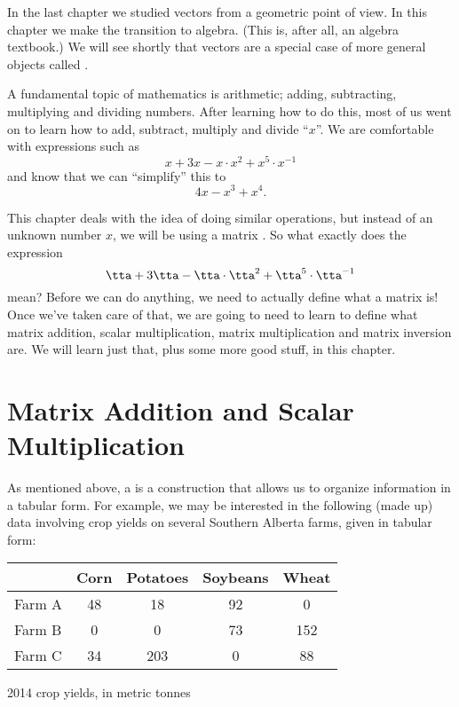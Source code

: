 In the last chapter we studied vectors from a geometric point of view. In this chapter we make the transition to algebra. (This is, after all, an algebra textbook.) We will see shortly that vectors are a special case of more general objects called .

A fundamental topic of mathematics is arithmetic; adding, subtracting, multiplying and dividing numbers. After learning how to do this, most of us went on to learn how to add, subtract, multiply and divide ``$x$''. We are comfortable with expressions such as 
\[
x+3x-x\cdot x^2+x^5\cdot x^{-1}
\]
and know that we can ``simplify'' this to 
\[
4x-x^3+x^4.
\]

This chapter deals with the idea of doing similar operations, but instead of an unknown number $x$, we will be using a matrix \tta. So what exactly does the expression 
\[
\tta+3\tta-\tta\cdot \tta^2+\tta^5\cdot \tta^{-1}
\]
mean? Before we can do anything, we need to actually define what a matrix is! Once we've taken care of that, we are going to need to learn to define what matrix addition, scalar multiplication, matrix multiplication and matrix inversion are. We will learn just that, plus some more good stuff, in this chapter.

\section{Matrix Addition and Scalar Multiplication}\label{sec:matrix_arithmetic_1}


As mentioned above, a  is a construction that allows us to organize information in a tabular form. For example, we may be interested in the following (made up) data involving crop yields on several Southern Alberta farms, given in tabular form:

\noindent\begin{minipage}{\textwidth}
\begin{center}
\begin{tabular}{l|cccc|}
	 & Corn & Potatoes & Soybeans & Wheat\\
\hline 
 Farm A & 48 & 18 & 92 & 0\\
 Farm B & 0 & 0 & 73 & 152\\
 Farm C & 34 & 203 & 0 & 88\\
 \hline
\end{tabular}
\end{center}
\captionsetup{type=figure}
\caption{2014 crop yields, in metric tonnes}
\end{minipage}

